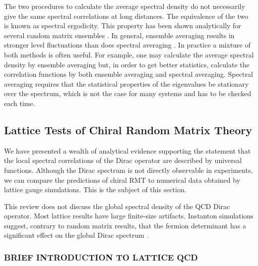 The two procedures to calculate the average spectral density
do not necessarily give the same spectral correlations at long
distances. The equivalence of the two is known as spectral
ergodicity.  This property has been shown analytically for several
random matrix ensembles \cite{Pandey,Weide-recent}.  In general,
ensemble averaging results in stronger level fluctuations than does
spectral averaging \cite{French-connection,Guhr99,Ande99}.  In practice
a mixture of both methods is often useful. For example, one may calculate
the average spectral density by ensemble averaging but, in order to
get better statistics, calculate the correlation functions by both
ensemble averaging and spectral averaging.  Spectral averaging requires
that the statistical properties of the eigenvalues be stationary over the
spectrum, which is not the case for many systems and has to be checked
each time.

\subsection{Lattice Tests of Chiral Random Matrix Theory}
\label{LatticeTests}

We have presented a wealth of analytical evidence supporting
the statement that the local spectral correlations of the Dirac
operator are described by universal functions.  Although the Dirac
spectrum is not directly observable in experiments, we can compare the
predictions of chiral RMT to numerical data obtained by lattice gauge
simulations.  This is the subject of this section.

This review does not discuss the global spectral density of the
QCD Dirac operator.  Most lattice results have large finite-size
artifacts.  Instanton simulations suggest, contrary to random
matrix results, that the fermion determinant has a significant effect on
the global Dirac spectrum \cite{Verb94c,Acta,Osbo98a,Sharan}.

\subsubsection{BRIEF INTRODUCTION TO LATTICE QCD}

